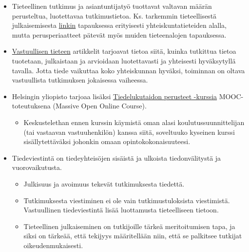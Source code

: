 \documentclass[
]{book}
\providecommand{\tightlist}{%
  \setlength{\itemsep}{0pt}\setlength{\parskip}{0pt}}
\begin{document}
\begin{itemize}
\item
  Tieteellinen tutkimus ja asiantuntijatyö tuottavat valtavan määrän perusteltua, luotettavaa tutkimustietoa. Ks. tarkemmin tieteellisestä julkaisemisesta \href{https://blogs.uef.fi/tiedonhaku-yhteiskuntatiede/tieteelliset-julkaisut/}{linkin} tapauksessa erityisesti yhteiskuntatieteiden alalla, mutta perusperiaatteet pätevät myös muiden tieteenalojen tapauksessa.
\item
  \href{https://vastuullinentiede.fi/fi/julkaiseminen}{Vastuullisen tieteen} artikkelit tarjoavat tietoa siitä, kuinka tutkittua tietoa tuotetaan, julkaistaan ja arvioidaan luotettavasti ja yhteisesti hyväksytyllä tavalla. Jotta tiede vaikuttaa koko yhteiskunnan hyväksi, toiminnan on oltava vastuullista tutkimuksen jokaisessa vaiheessa.
\item
  Helsingin yliopisto tarjoaa lisäksi \href{https://tiedelukutaito.mooc.fi/}{Tiedelukutaidon perusteet -kurssia} MOOC-toteutuksena (Massive Open Online Course).

  \begin{itemize}
  \tightlist
  \item
    Keskustelethan ennen kurssin käymistä oman alasi koulutussuunnittelijan (tai vastaavan vastuuhenkilön) kanssa siitä, soveltuuko kyseinen kurssi sisällytettäväksi johonkin omaan opintokokonaisuuteesi.
  \end{itemize}
\end{itemize}

\hfill\break

\begin{itemize}
\tightlist
\item
  Tiedeviestintä on tiedeyhteisöjen sisäistä ja ulkoista tiedonvälitystä ja vuorovaikutusta.

  \begin{itemize}
  \tightlist
  \item
    Julkisuus ja avoimuus tekevät tutkimuksesta tiedettä.
  \item
    Tutkimuksesta viestiminen ei ole vain tutkimustuloksista viestimistä. Vastuullinen tiedeviestintä lisää luottamusta tieteelliseen tietoon.
  \item
    Tieteellinen julkaiseminen on tutkijoille tärkeä meritoitumisen tapa, ja siksi on tärkeää, että tekijyys määritellään niin, että se palkitsee tutkijat oikeudenmukaisesti.
  \end{itemize}
\end{itemize}
\end{document}
